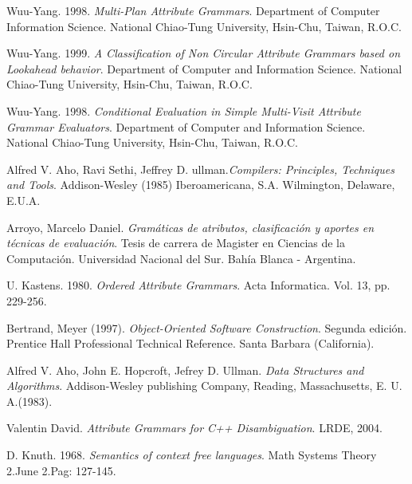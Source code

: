 
\begin{thebibliography}{10}

 Wuu-Yang. 1998. \textit{Multi-Plan Attribute Grammars}. Department of Computer Information Science. National Chiao-Tung University, Hsin-Chu, Taiwan, R.O.C.

 Wuu-Yang. 1999. \textit{A Classification of Non Circular Attribute Grammars based on Lookahead behavior}. Department of Computer and Information Science. National Chiao-Tung University, Hsin-Chu, Taiwan, R.O.C.

 Wuu-Yang. 1998. \textit{Conditional Evaluation in Simple Multi-Visit Attribute Grammar Evaluators}. Department of Computer and Information Science. National
Chiao-Tung University, Hsin-Chu, Taiwan, R.O.C.

 Alfred V. Aho, Ravi Sethi, Jeffrey D. ullman.\textit{Compilers: Principles, Techniques and Tools}. Addison-Wesley (1985)  Iberoamericana, S.A. Wilmington, Delaware, E.U.A.

 Arroyo, Marcelo Daniel. \textit{Gramáticas de atributos, clasificación y aportes en técnicas de evaluación}. Tesis de carrera de Magister en Ciencias de la Computación. Universidad Nacional del Sur. Bahía Blanca - Argentina.

 U. Kastens. 1980. \textit{Ordered Attribute Grammars}. Acta Informatica. Vol. 13, pp. 229-256.

 Bertrand, Meyer (1997). \textit{Object-Oriented Software Construction}. Segunda edición. Prentice Hall Professional Technical Reference. Santa Barbara (California).

 Alfred V. Aho, John E. Hopcroft, Jefrey D. Ullman. \textit{Data Structures and Algorithms}. Addison-Wesley publishing Company, Reading, Massachusetts, E. U. A.(1983).

 Valentin David. \textit{Attribute Grammars for C++ Disambiguation}. LRDE, 2004.

 D. Knuth. 1968. \textit{Semantics of context free languages}. Math Systems Theory 2.June 2.Pag: 127-145.


% 
% 


\end{thebibliography}
